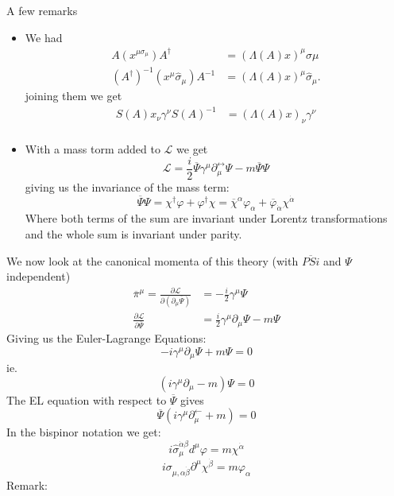 \documentclass{report}
\begin{document}
A few remarks
\begin{itemize}
  \item We had
    \begin{align*}
      A\left( x^{\mu \sigma_\mu}  \right) A^\dagger &= \left( \Lambda\left( A \right) x \right) ^{\mu} \sigma \mu\\
      \left( A^\dagger \right) ^{-1} \left( x^{\mu} \hat{\sigma}_\mu \right) A^{-1} &= \left( \Lambda\left( A \right) x \right) ^{\mu} \hat{\sigma}_\mu
    .\end{align*}
    joining them we get 
    \begin{align*}
      S\left( A \right)  x_\nu \gamma^{\nu} S\left( A \right) ^{-1} &= \left( \Lambda\left( A \right) x \right) _\nu \gamma^{\nu}  \\
    \end{align*}
  \item With a mass torm added to $\mathcal{L} $ we get \[
  \mathcal{L} = \frac{i}{2} \overline{\Psi}\gamma^{\mu} \partial^{\leftrightarrow}_\mu \Psi - m \overline{\Psi} \Psi 
  \] giving us the invariance of the mass term: \[
  \overline{\Psi} \Psi = \chi^\dagger\varphi + \varphi^\dagger \chi = \overline{\chi}^{\alpha} \varphi_\alpha + \overline{\varphi}_{\dot{\alpha}} \chi^{\dot{\alpha}} 
  \] Where both terms of the sum are invariant under Lorentz transformations and the whole sum is invariant under parity.
\end{itemize}
We now look at the canonical momenta of this theory (with $\overline{PSi} $ and $\Psi$ independent)
\begin{align*}
  \overline{\pi}^{\mu}  = \frac{\partial \mathcal{L} }{\partial \left( \partial_\mu \overline{\Psi} \right) } &= - \frac{i}{2} \gamma^{\mu} \Psi \\
  \frac{\partial \mathcal{L} }{\partial \overline{\Psi} } &= \frac{i}{2} \gamma^{\mu} \partial_\mu \Psi - m\Psi 
\end{align*}
Giving us the Euler-Lagrange Equations: \[
-i \gamma^{\mu} \partial_\mu \Psi + m\Psi = 0 
\] ie. \[
\left( i \gamma^{\mu} \partial_\mu - m \right) \Psi = 0
\] 
The EL equation with respect to $\overline{\Psi} $ gives \[
\overline{\Psi} \left( i\gamma^{\mu} \partial_\mu^{\leftarrow} + m \right) = 0
\] 
In the bispinor notation we get: \[
i \hat{\sigma}_\mu ^{\dot{\alpha} \beta} d^{\mu} \varphi = m \chi^{\dot{\alpha}} 
\] \[
i \sigma_{\mu, \alpha \dot{\beta}} \partial^{\mu} \chi^{\dot{\beta}} = m \varphi_\alpha 
\] 
Remark:
\end{document}
